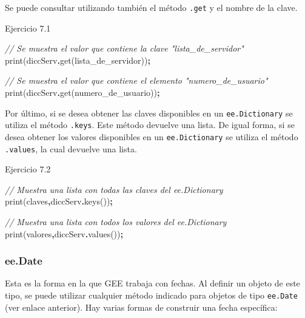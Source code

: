 \documentclass[
  12pt,
  letterpaper,
  twoside]{book}
\newenvironment{Shaded}{\begin{snugshade}}{\end{snugshade}}
\newcommand{\CommentTok}[1]{\textcolor[rgb]{0.56,0.35,0.01}{\textit{#1}}}
\newcommand{\FunctionTok}[1]{\textcolor[rgb]{0.00,0.00,0.00}{#1}}
\newcommand{\NormalTok}[1]{#1}
\newcommand{\OperatorTok}[1]{\textcolor[rgb]{0.81,0.36,0.00}{\textbf{#1}}}
\newcommand{\StringTok}[1]{\textcolor[rgb]{0.31,0.60,0.02}{#1}}
\begin{document}
Se puede consultar utilizando también el método \texttt{.get} y el nombre de la clave.

Ejercicio 7.1

\begin{Shaded}
\begin{Highlighting}[]
\CommentTok{// Se muestra el valor que contiene la clave "lista\_de\_servidor"}
\FunctionTok{print}\NormalTok{(diccServ}\OperatorTok{.}\FunctionTok{get}\NormalTok{(}\StringTok{\textquotesingle{}lista\_de\_servidor\textquotesingle{}}\NormalTok{))}\OperatorTok{;}

\CommentTok{// Se muestra el valor que contiene el elemento "numero\_de\_usuario"   }
\FunctionTok{print}\NormalTok{(diccServ}\OperatorTok{.}\FunctionTok{get}\NormalTok{(}\StringTok{\textquotesingle{}numero\_de\_usuario\textquotesingle{}}\NormalTok{))}\OperatorTok{;}        
\end{Highlighting}
\end{Shaded}

Por último, si se desea obtener las claves disponibles en un \texttt{ee.Dictionary} se utiliza el método \texttt{.keys}. Este método devuelve una lista. De igual forma, si se desea obtener los valores disponibles en un \texttt{ee.Dictionary} se utiliza el método \texttt{.values}, la cual devuelve una lista.

Ejercicio 7.2

\begin{Shaded}
\begin{Highlighting}[]
\CommentTok{// Muestra una lista con todas las claves del ee.Dictionary}
\FunctionTok{print}\NormalTok{(}\StringTok{\textquotesingle{}claves\textquotesingle{}}\OperatorTok{,}\NormalTok{diccServ}\OperatorTok{.}\FunctionTok{keys}\NormalTok{())}\OperatorTok{;}    

\CommentTok{// Muestra una lista con todos los valores del ee.Dictionary}
\FunctionTok{print}\NormalTok{(}\StringTok{\textquotesingle{}valores\textquotesingle{}}\OperatorTok{,}\NormalTok{diccServ}\OperatorTok{.}\FunctionTok{values}\NormalTok{())}\OperatorTok{;}  
\end{Highlighting}
\end{Shaded}

\hypertarget{ee.date}{%
\subsubsection*{ee.Date}\label{ee.date}}

Esta es la forma en la que GEE trabaja con fechas. Al definir un objeto de este tipo, se puede utilizar cualquier método indicado para objetos de tipo \texttt{ee.Date} (ver enlace anterior). Hay varias formas de construir una fecha específica:
\end{document}
